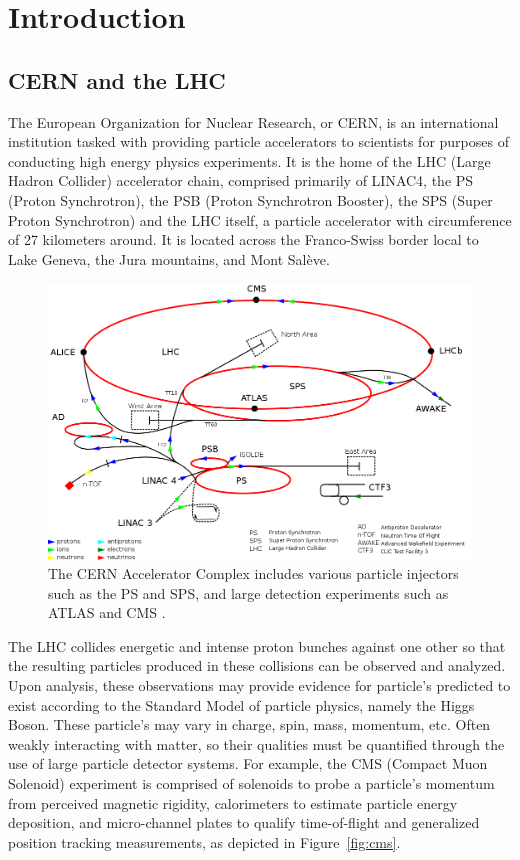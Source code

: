\chapter{Introduction}

\section{CERN and the LHC}

The European Organization for Nuclear Research, or CERN, is an international institution tasked with providing particle accelerators to scientists for purposes of conducting high energy physics experiments. It is the home of the LHC (Large Hadron Collider) accelerator chain, comprised primarily of LINAC4, the PS (Proton Synchrotron), the PSB (Proton Synchrotron Booster), the SPS (Super Proton Synchrotron) and the LHC itself, a particle accelerator with circumference of 27 kilometers around. It is located across the Franco-Swiss border local to Lake Geneva, the Jura mountains, and Mont Salève.

\begin{figure}
    \centering
    \includegraphics{figs/1024px-Cern-accelerator-complex.svg.png}
    \caption{The CERN Accelerator Complex includes various particle injectors such as the PS and SPS, and large detection experiments such as ATLAS and CMS \cite{forthomme_cern_2021}.}
    \label{fig:cern}
\end{figure}

The LHC collides energetic and intense proton bunches against one other so that the resulting particles produced in these collisions can be observed and analyzed. Upon analysis, these observations may provide evidence for particle's predicted to exist according to the Standard Model of particle physics, namely the Higgs Boson. These particle's may vary in charge, spin, mass, momentum, etc. Often weakly interacting with matter, so their qualities must be quantified through the use of large particle detector systems. For example, the CMS (Compact Muon Solenoid) experiment is comprised of solenoids to probe a particle's momentum from perceived magnetic rigidity, calorimeters to estimate particle energy deposition, and micro-channel plates to qualify time-of-flight and generalized position tracking measurements, as depicted in Figure~\ref{fig:cms}.

